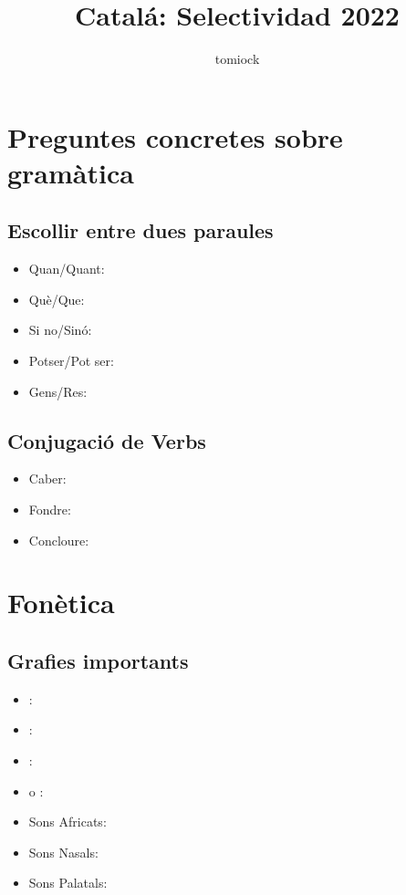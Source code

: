 \documentclass[arial,a4paper,print]{article}
\title{Catalá: Selectividad 2022}
\author{tomiock}
\begin{document}
\maketitle

\section{Preguntes concretes sobre gramàtica}

\subsection{Escollir entre dues paraules}
\begin{itemize}
\item Quan/Quant: 
\item Què/Que: 
\item Si no/Sinó: 
\item Potser/Pot ser:
\item Gens/Res:


	
\end{itemize}

\subsection{Conjugació de Verbs}
\begin{itemize}
\item Caber:
\item Fondre:
\item Concloure:



\end{itemize}

\section{Fonètica}
\subsection{Grafies importants}
\begin{itemize}

\item \textipa{[z]}: 
\item \textipa{[s]}: 
\item \textipa{[tS]}: 
\item \textipa{[Z]} o \textipa{[dZ]}: 
\item Sons Africats: 
\item Sons Nasals: 
\item Sons Palatals: 

\end{itemize}
	
\end{document}
